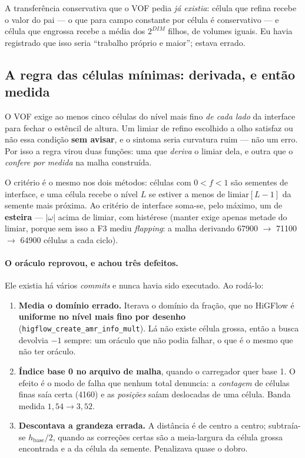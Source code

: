 A transfer\^encia conservativa que o VOF pedia \emph{j\'a existia}: c\'elula que
refina recebe o valor do pai --- o que para campo constante por c\'elula \'e
conservativo --- e c\'elula que engrossa recebe a m\'edia dos $2^{DIM}$ filhos,
de volumes iguais. Eu havia registrado que isso seria ``trabalho pr\'oprio e
maior''; estava errado.

\subsection{A regra das c\'elulas m\'inimas: derivada, e ent\~ao medida}

O VOF exige ao menos cinco c\'elulas do n\'ivel mais fino \emph{de cada lado} da
interface para fechar o est\^encil de altura. Um limiar de refino escolhido a
olho satisfaz ou n\~ao essa condi\c{c}\~ao \textbf{sem avisar}, e o sintoma
seria curvatura ruim --- n\~ao um erro. Por isso a regra virou duas
fun\c{c}\~oes: uma que \emph{deriva} o limiar dela, e outra que o \emph{confere
por medida} na malha constru\'ida.

O crit\'erio \'e o mesmo nos dois m\'etodos: c\'elulas com $0<f<1$ s\~ao
sementes de interface, e uma c\'elula recebe o n\'ivel $L$ se estiver a menos de
$\text{limiar}[L-1]$ da semente mais pr\'oxima. Ao crit\'erio de interface
soma-se, pelo m\'aximo, um de \textbf{esteira} --- $\lvert\omega\rvert$ acima de
limiar, com hist\'erese (manter exige apenas metade do limiar, porque sem isso a
F3 mediu \emph{flapping}: a malha derivando \num{67900} $\to$ \num{71100} $\to$
\num{64900} c\'elulas a cada ciclo).

\paragraph{O or\'aculo reprovou, e achou tr\^es defeitos.} Ele existia h\'a
v\'arios \emph{commits} e nunca havia sido executado. Ao rod\'a-lo:

\begin{enumerate}
  \item \textbf{Media o dom\'inio errado.} Iterava o dom\'inio da fra\c{c}\~ao,
    que no HiGFlow \'e \textbf{uniforme no n\'ivel mais fino por desenho}
    (\texttt{higflow\_\allowbreak{}create\_\allowbreak{}amr\_\allowbreak{}info\_\allowbreak{}mult}). L\'a n\~ao existe c\'elula
    grossa, ent\~ao a busca devolvia $-1$ sempre: um or\'aculo que n\~ao podia
    falhar, o que \'e o mesmo que n\~ao ter or\'aculo.
  \item \textbf{\'Indice base 0 no arquivo de malha}, quando o carregador quer
    base 1. O efeito \'e o modo de falha que nenhum total denuncia: a
    \emph{contagem} de c\'elulas finas saía certa (\num{4160}) e as
    \emph{posi\c{c}\~oes} saíam deslocadas de uma c\'elula. Banda medida
    $1{,}54 \to 3{,}52$.
  \item \textbf{Descontava a grandeza errada.} A dist\^ancia \'e de centro a
    centro; subtraía-se $h_{\text{base}}/2$, quando as corre\c{c}\~oes certas
    s\~ao a meia-largura da c\'elula grossa encontrada e a da c\'elula da
    semente. Penalizava quase o dobro.
\end{enumerate}

